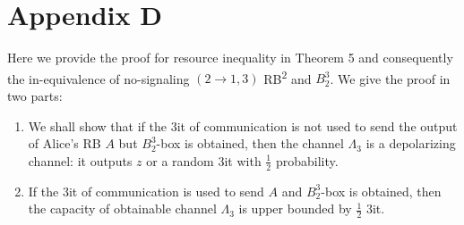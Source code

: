 \section*{Appendix D}
Here we provide the proof for resource inequality in Theorem 5 and consequently the in-equivalence of no-signaling $(2\rightarrow 1,3)$ RB\textsuperscript{2} and $B^3_2$. We give the proof in two parts: 
\begin{enumerate}
\item We shall show that if the $3$it of communication is not used to send the output of Alice's RB $A$ but $B^3_2$-box is obtained, then the channel $\Lambda_3$ is a depolarizing channel: it outputs $z$  or a random $3$it with $\frac{1}{2}$ probability.
\item If the $3$it of communication is used to send $A$ and $B^3_2$-box is obtained, then the capacity of obtainable channel $\Lambda_3$ is upper bounded by $\frac{1}{2}$ $3$it. 
\end{enumerate}
